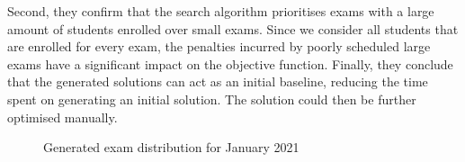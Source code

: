 Second, they confirm that the search algorithm prioritises exams with a large amount of students enrolled over small exams. Since we consider all students that are enrolled for every exam, the penalties incurred by poorly scheduled large exams have a significant impact on the objective function. Finally, they conclude that the generated solutions can act as an initial baseline, reducing the time spent on generating an initial solution. The solution could then be further optimised manually.

\begin{figure}[H]
  \centering
  \hfill
  \caption{Generated exam distribution for January 2021}
  \label{fig:generated_sem1}
\end{figure}

